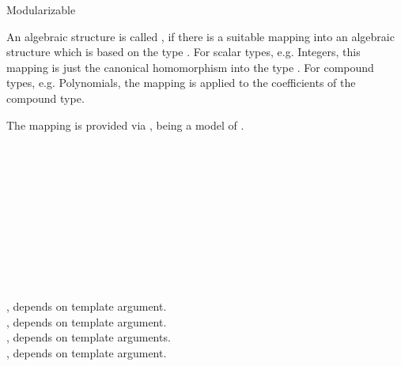 \begin{ccRefConcept}{Modularizable}

\ccDefinition

An algebraic structure is called \ccRefName, if there is a suitable mapping 
into an algebraic structure which is based on the type . 
For scalar types, e.g. Integers, this mapping is just the canonical homomorphism 
into the type . For compound types, e.g. Polynomials, 
the mapping is applied to the coefficients of the compound type. 

The mapping is provided via , 
being a model of .

\ccHasModels

\\
\\
\\
\\
\\
\\
\\
\\
\\
\\

, depends on template argument.\\ 
, depends on template argument.\\ 
, depends on template arguments.\\ 
, depends on template argument.\\ 

\ccSeeAlso
{}\\
\\

\end{ccRefConcept}